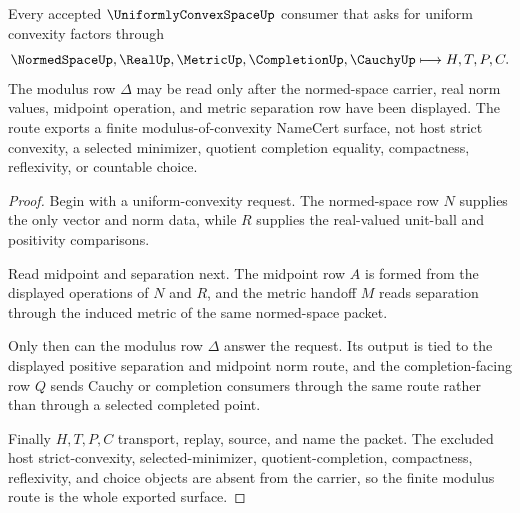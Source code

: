 \begin{theorem}
\label{thm:uniformly-convex-space-modulus-convexity-route}
Every accepted $\UniformlyConvexSpaceUp$ consumer that asks for uniform convexity factors through
$$
\NormedSpaceUp,\RealUp,\MetricUp,\CompletionUp,\CauchyUp \longmapsto H,T,P,C .
$$
The modulus row $\Delta$ may be read only after the normed-space carrier, real norm values, midpoint operation, and metric separation row have been displayed. The route exports a finite modulus-of-convexity NameCert surface, not host strict convexity, a selected minimizer, quotient completion equality, compactness, reflexivity, or countable choice.
\end{theorem}
\begin{proof}
Begin with a uniform-convexity request. The normed-space row $N$ supplies the only vector and norm data, while $R$ supplies the real-valued unit-ball and positivity comparisons.

Read midpoint and separation next. The midpoint row $A$ is formed from the displayed operations of $N$ and $R$, and the metric handoff $M$ reads separation through the induced metric of the same normed-space packet.

Only then can the modulus row $\Delta$ answer the request. Its output is tied to the displayed positive separation and midpoint norm route, and the completion-facing row $Q$ sends Cauchy or completion consumers through the same route rather than through a selected completed point.

Finally $H,T,P,C$ transport, replay, source, and name the packet. The excluded host strict-convexity, selected-minimizer, quotient-completion, compactness, reflexivity, and choice objects are absent from the carrier, so the finite modulus route is the whole exported surface.
\end{proof}



